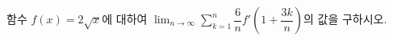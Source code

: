 함수 $f(x)=2\sqrt{x}$에 대하여 $\displaystyle\lim_{n\to\infty}\sum_{k=1}^{n}\dfrac{6}{n}f'\left(1+\dfrac{3k}{n}\right)$의 값을 구하시오.

